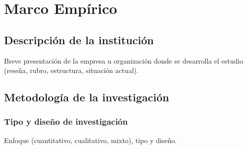 \chapter{Marco Empírico}
\label{cap:marco-empirico}



\section{Descripción de la institución}

Breve presentación de la empresa u organización donde se desarrolla el estudio
(reseña, rubro, estructura, situación actual).

\section{Metodología de la investigación}

\subsection{Tipo y diseño de investigación}
Enfoque (cuantitativo, cualitativo, mixto), tipo y diseño.

